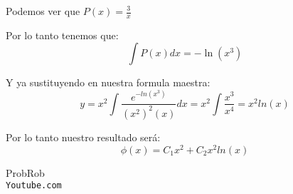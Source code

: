 \documentclass[12pt]{report}                               %
\begin{document}
    Podemos ver que $P(x) = \frac{3}{x}$

    Por lo tanto tenemos que:
    \begin{equation*}
        \int P(x) dx = -\ln (x^3)
    \end{equation*}

    Y ya sustituyendo en nuestra formula maestra:
    \begin{equation*}
        y = x^2 \int \frac{ e^{-ln(x^3)} }{(x^2)^2(x)} dx = x^2 \int \frac{x^3}{x^4} = x^2 ln(x)
    \end{equation*}

    Por lo tanto nuestro resultado será:
    \begin{equation*}
        \phi(x) = C_1 x^2 + C_2 x^2 ln(x)
    \end{equation*}



\clearpage

    \begin{thebibliography}{9}

        ProbRob
        \\\texttt{Youtube.com}


     

\end{thebibliography}
\end{document}
